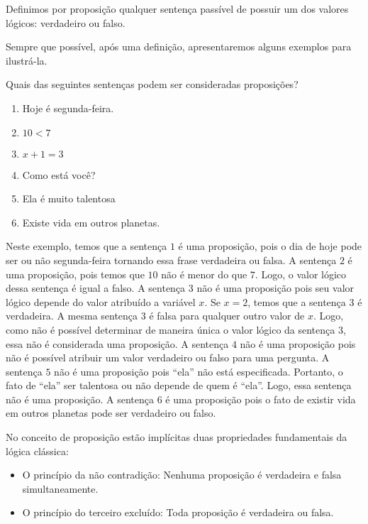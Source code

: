 \begin{Definition}[Proposi\c{c}\~ao]
  Definimos por proposi\c{c}\~ao qualquer senten\c{c}a pass\'ivel de possuir um dos valores l\'ogicos: verdadeiro ou falso.
\end{Definition}

Sempre que poss\'ivel, ap\'os uma defini\c{c}\~ao, apresentaremos alguns exemplos para ilustr\'a-la.

\begin{Example}
  Quais das seguintes senten\c{c}as podem ser consideradas proposi\c{c}\~oes?
  \begin{enumerate}
    \item Hoje \'e segunda-feira.
    \item $10 < 7$
    \item $x + 1 = 3$
    \item Como est\'a voc\^e?
    \item Ela \'e muito talentosa
    \item Existe vida em outros planetas.
  \end{enumerate}
  Neste exemplo, temos que a senten\c{c}a $1$ \'e uma proposi\c{c}\~ao, pois o dia de hoje pode ser ou n\~ao segunda-feira tornando essa frase
  verdadeira ou falsa. A senten\c{c}a $2$ \'e uma proposi\c{c}\~ao, pois temos que $10$ n\~ao \'e menor do que $7$. Logo, o valor l\'ogico dessa
  senten\c{c}a \'e igual a falso. A senten\c{c}a $3$ n\~ao \'e uma proposi\c{c}\~ao pois seu valor l\'ogico depende do valor atribu\'ido a 
  vari\'avel $x$. Se $x = 2$, temos que a senten\c{c}a $3$ \'e verdadeira. A mesma senten\c{c}a $3$ \'e falsa para qualquer outro valor de $x$. 
  Logo, como n\~ao \'e poss\'ivel determinar de maneira \'unica o valor l\'ogico da senten\c{c}a $3$, essa n\~ao \'e considerada uma 
  proposi\c{c}\~ao. 
  A senten\c{c}a $4$ n\~ao \'e uma proposi\c{c}\~ao pois n\~ao \'e poss\'ivel atribuir um valor verdadeiro ou falso para uma pergunta.
  A senten\c{c}a $5$ n\~ao \'e uma proposi\c{c}\~ao pois ``ela'' n\~ao est\'a especificada. Portanto, o fato de ``ela'' ser talentosa ou n\~ao
  depende de quem \'e ``ela''. Logo, essa senten\c{c}a n\~ao \'e uma proposi\c{c}\~ao.
  A senten\c{c}a $6$ \'e uma proposi\c{c}\~ao pois o fato de existir vida em outros planetas pode ser verdadeiro ou falso.
\end{Example}

No conceito de proposi\c{c}\~ao est\~ao impl\'icitas duas propriedades fundamentais da l\'ogica cl\'assica:
\begin{itemize}
  \item O princ\'ipio da n\~ao contradi\c{c}\~ao: Nenhuma proposi\c{c}\~ao \'e verdadeira e falsa simultaneamente.
  \item O princ\'ipio do terceiro exclu\'ido: Toda proposi\c{c}\~ao \'e verdadeira ou falsa.
\end{itemize}

